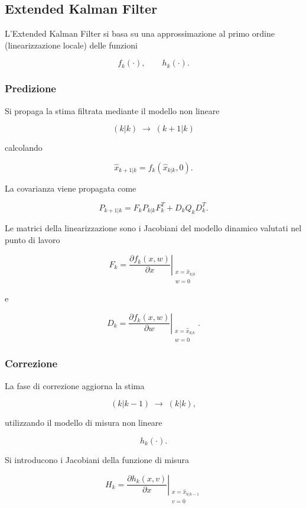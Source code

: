 \documentclass[11pt,a4paper]{article}
\begin{document}
\subsection*{Extended Kalman Filter}

L'Extended Kalman Filter si basa su una approssimazione al primo ordine (linearizzazione locale) delle funzioni

\[
f_k(\cdot),
\qquad
h_k(\cdot).
\]

\subsubsection*{Predizione}

Si propaga la stima filtrata mediante il modello non lineare

\[
(k|k)
\;\longrightarrow\;
(k+1|k)
\]

calcolando

\[
\boxed{
\hat{x}_{k+1|k}
=
f_k(\hat{x}_{k|k},0).
}
\]

La covarianza viene propagata come

\[
\boxed{
P_{k+1|k}
=
F_kP_{k|k}F_k^T
+
D_kQ_kD_k^T.
}
\]

Le matrici della linearizzazione sono i Jacobiani del modello dinamico valutati nel punto di lavoro

\[
\boxed{
F_k
=
\left.
\frac{\partial f_k(x,w)}
{\partial x}
\right|_{
\substack{
x=\hat{x}_{k|k}\\
w=0
}
}
}
\]

e

\[
\boxed{
D_k
=
\left.
\frac{\partial f_k(x,w)}
{\partial w}
\right|_{
\substack{
x=\hat{x}_{k|k}\\
w=0
}
}.
}
\]

\subsubsection*{Correzione}

La fase di correzione aggiorna la stima

\[
(k|k-1)
\;\longrightarrow\;
(k|k),
\]

utilizzando il modello di misura non lineare

\[
h_k(\cdot).
\]

Si introducono i Jacobiani della funzione di misura

\[
\boxed{
H_k
=
\left.
\frac{\partial h_k(x,v)}
{\partial x}
\right|_{
\substack{
x=\hat{x}_{k|k-1}\\
v=0
}
}
}
\]
\end{document}
